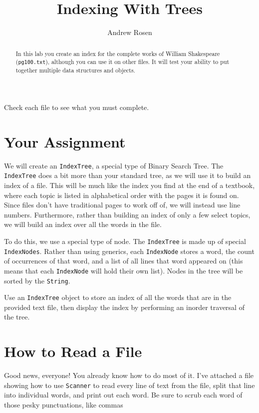 \documentclass[10pt,letterpaper]{article}
\author{Andrew Rosen}
\title{Indexing With Trees}
\date{}
\begin{document}
	
	\maketitle
	
	\begin{abstract}
		In this lab you create an index for the complete works of William Shakespeare (\texttt{pg100.txt}), although you can use it on other files.
		It will test your ability to put together multiple data structures and objects.
	\end{abstract}


	Check each file to see what you must complete.
	\section{Your Assignment}
	We will create an \texttt{IndexTree}, a special type of Binary Search Tree.
	The \texttt{IndexTree} does a bit more than your standard tree, as we will use it to build an index of a file.
	This will be much like the index you find at the end of a textbook, where each topic is listed in alphabetical order with the pages it is found on.  
	Since files don't have traditional pages to work off of, we will instead use line numbers.
	Furthermore, rather than building an index of only a few select topics, we will build an index over all the words in the file.

	To do this, we use a special type of node.
	The \texttt{IndexTree} is made up of special \texttt{IndexNodes}.
	Rather than using generics, each \texttt{IndexNode} stores a word, the count of occurrences of that word, and a list of all lines that word appeared on (this means that each \texttt{IndexNode} will hold their own list).  
	Nodes in the tree will be sorted by the \texttt{String}.
	
	Use an \texttt{IndexTree}  object to store an index of all the words that are in the provided text file, then display the index by performing an inorder traversal of the tree.
	
	
	
	\section{How to Read a File}
	
	Good news, everyone!
	You already know how to do most of it.
	I've attached a file showing how to use \texttt{Scanner} to read every line of text from the file, split that line into individual words, and print out each word.
	Be sure to scrub each word of those pesky punctuations, like commas
	
\end{document}
